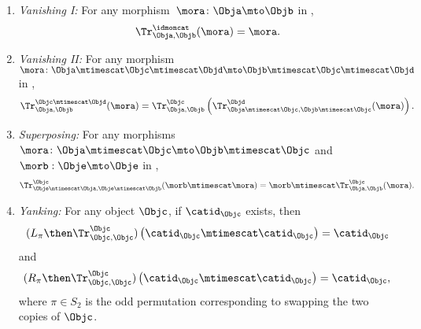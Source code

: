 \begin{ctdefinition}
\begin{enumerate}
        \item \emph{Vanishing I:}
              For any morphism~$\mora \colon \Obja\mto \Objb$ in \CatC,
              \begin{equation}
                  \label{eq:semicat-trace-vanishing_1}
                  \Tr_{\Obja,\Objb}^\idmoncat (\mora)=\mora.
              \end{equation}
              
        \item \emph{Vanishing II:}
              For any morphism~$\mora \colon \Obja\mtimescat \Objc \mtimescat \Objd \mto \Objb\mtimescat \Objc \mtimescat \Objd$ in \CatC,
              \begin{equation}
                  \label{eq:semicat-trace-vanishing_2}
                  \Tr_{\Obja,\Objb}^{\Objc\mtimescat \Objd}(\mora)=\Tr_{\Obja,\Objb}^\Objc\left(
                  \Tr_{\Obja \mtimescat \Objc , \Objb \mtimescat \Objc}^\Objd(\mora)\right).
              \end{equation}
              
        \item \emph{Superposing:}
              For any morphisms~$\mora\colon \Obja\mtimescat \Objc \mto \Objb\mtimescat \Objc$ and $\morb : \Obje \mto \Obje$ in \CatC,
              \begin{equation}
                  \label{eq:semicat-trace-superposing}
                  \Tr_{\Obje\mtimescat \Obja,\Obje\mtimescat \Objb}^{\Objc}(\morb \mtimescat \mora)=\morb \mtimescat \Tr_{\Obja,\Objb}^\Objc(\mora).
              \end{equation}
              
        \item \emph{Yanking:}
              For any object $\Objc$, if $\catid_\Objc$ exists, then
              \begin{equation}
                  \label{eq:semicat-trace-yanking-I}
                  (L_\pi  \then \Tr_{\Objc,\Objc}^\Objc)\left(\catid_\Objc \mtimescat \catid_\Objc \right)=\catid_\Objc
              \end{equation}
              and
              \begin{equation}
                  \label{eq:semicat-trace-yanking-II}
                  (R_\pi  \then \Tr_{\Objc,\Objc}^\Objc)\left(\catid_\Objc \mtimescat \catid_\Objc \right)=\catid_\Objc,
                             \end{equation}
                             where $\pi \in S_2$ is the odd permutation corresponding to swapping the two copies of $\Objc$. 
    \end{enumerate}
\end{ctdefinition}


